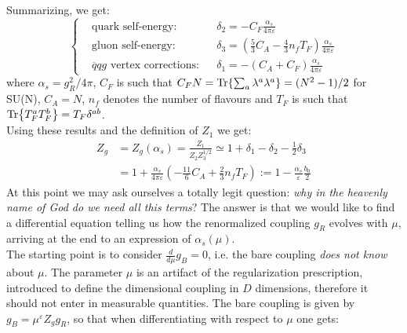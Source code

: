 \documentclass[../main.tex]{subfiles}
\begin{document}
Summarizing, we get:
\[
\left\{
\begin{aligned}
&\text{quark self-energy:}&&\delta_2=-C_F\frac{\alpha_s}{4\pi\varepsilon}\\
&\text{gluon self-energy:}&&\delta_3=\left(\frac{5}{3}C_A-\frac{4}{3}n_fT_F\right)\frac{\alpha_s}{4\pi\varepsilon}\\
&\text{$\overline{q}qg$ vertex corrections:}&&\delta_1=-(C_A+C_F)\frac{\alpha_s}{4\pi\varepsilon}
\end{aligned}
\right.
\]
where $\alpha_s=g_R^2/4\pi$, $C_F$ is such that $C_FN=\Tr{\sum_a\lambda^a\lambda^a}=(N^2-1)/2$ for SU(N), $C_A=N$, $n_f$ denotes the number of flavours and $T_F$ is such that $\Tr{T_F^aT_F^b}=T_F\delta^{ab}$.\\
Using these results and the definition of $Z_1$ we get:
\begin{align*}
Z_g&=Z_g(\alpha_s)=\frac{Z_1}{Z_2Z_3^{1/2}}\simeq1+\delta_1-\delta_2-\frac{1}{2}\delta_3\\
&=1+\frac{\alpha_s}{4\pi\varepsilon}\left(-\frac{11}{6}C_A+\frac{2}{3}n_fT_F\right):=1-\frac{\alpha_s}{\varepsilon}\frac{b_0}{2}
\end{align*}
At this point we may ask ourselves a totally legit question: \textit{why in the heavenly name of God do we need all this terms}? The answer is that we would like to find a differential equation telling us how the renormalized coupling $g_R$ evolves with $\mu$, arriving at the end to an expression of $\alpha_s(\mu)$.\\
The starting point is to consider $\frac{d}{d\mu}g_B=0$, i.e. the bare coupling \textit{does not know} about $\mu$. The parameter $\mu$ is an artifact of the regularization prescription, introduced to define the dimensional coupling in $D$ dimensions, therefore it should not enter in measurable quantities. The bare coupling is given by $g_B=\mu^\varepsilon Z_g g_R$, so that when differentiating with respect to $\mu$ one gets:
\end{document}
